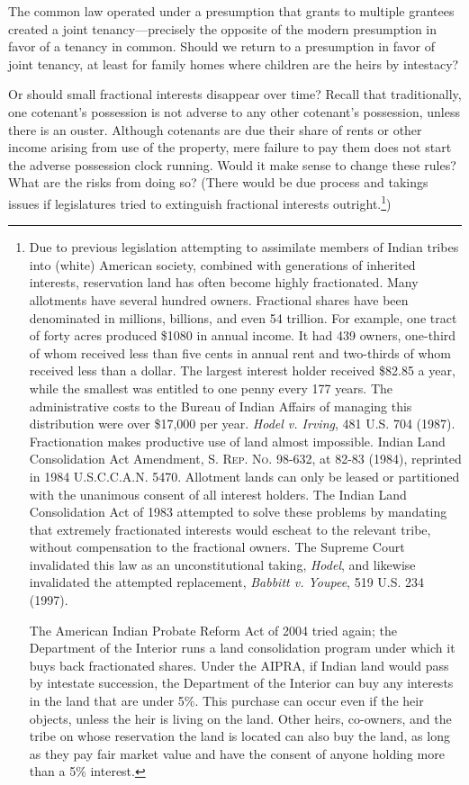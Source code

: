 The common law operated under a presumption that grants to multiple grantees
created a joint tenancy---precisely the opposite of the modern presumption in
favor of a tenancy in common. Should we return to a presumption in favor of
joint tenancy, at least for family homes where children are the heirs by
intestacy?

Or should small fractional interests disappear over time? Recall that
traditionally, one cotenant's possession is not adverse to any other cotenant's
possession, unless there is an ouster. Although cotenants are due their share
of rents or other income arising from use of the property, mere failure to pay
them does not start the adverse possession clock running. Would it make sense
to change these rules? What are the risks from doing so? (There would be due
process and takings issues if legislatures tried to extinguish fractional
interests outright.\footnote{Due to previous legislation attempting to
assimilate members of Indian tribes into (white) American society, combined
with generations of inherited interests, reservation land has often become
highly fractionated. Many allotments have several hundred owners. Fractional
shares have been denominated in millions, billions, and even 54 trillion. For
example, one tract of forty acres produced \$1080 in annual income. It had 439
owners, one-third of whom received less than five cents in annual rent and
two-thirds of whom received less than a dollar. The largest interest holder
received \$82.85 a year, while the smallest was entitled to one penny every 177
years. The administrative costs to the Bureau of Indian Affairs of managing
this distribution were over \$17,000 per year. \emph{Hodel v. Irving}, 481 U.S.
704 (1987). Fractionation makes productive use of land almost impossible. Indian
Land Consolidation Act Amendment, \textsc{S. Rep. No.} 98-632, at 82-83 (1984),
reprinted in 1984 U.S.C.C.A.N. 5470. Allotment lands can only be leased or
partitioned with the unanimous consent of all interest holders. The Indian Land
Consolidation Act of 1983 attempted to solve these problems by mandating that
extremely fractionated interests would escheat to the relevant tribe, without
compensation to the fractional owners. The Supreme Court invalidated this law
as an unconstitutional taking, \textit{Hodel}, and likewise invalidated the
attempted replacement, \textit{Babbitt v. Youpee}, 519 U.S. 234 (1997). \par
The American Indian Probate Reform Act of 2004 tried again; the Department of
the Interior runs a land consolidation program under which it buys back
fractionated shares. Under the AIPRA, if Indian land would pass by intestate
succession, the Department of the Interior can buy any interests in the land
that are under 5\%. This purchase can occur even if the heir objects, unless
the heir is living on the land. Other heirs, co-owners, and the tribe on whose
reservation the land is located can also buy the land, as long as they pay fair
market value and have the consent of anyone holding more than a 5\% interest.})


